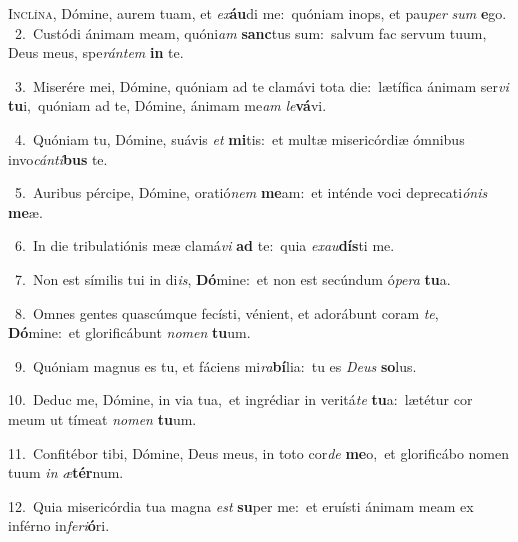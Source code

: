 \lettrine{\initial\textcolor{\initialcolor}{I}}{nclína,} Dómine, aurem tuam, et \textit{ex}\-\textbf{áu}di me:~\star quóniam inops, et pau\textit{per} \textit{sum} \textbf{e}\-go.\\
{\numbfont\textcolor{\numbcolor}{~2.}}~Custódi ánimam meam, quóni\textit{am} \textbf{sanc}\-tus sum:~\star salvum fac servum tuum, Deus meus, spe\-\textit{rán}\-\textit{tem} \textbf{in} te.\par
{\numbfont\textcolor{\numbcolor}{~3.}}~Miserére mei, Dómine, quóniam ad te clamávi tota die:~\dagger lætífica ánimam ser\textit{vi} \textbf{tu}\-i,~\star quóniam ad te, Dómine, ánimam me\textit{am} \textit{le}\-\textbf{vá}vi.\par
{\numbfont\textcolor{\numbcolor}{~4.}}~Quóniam tu, Dómine, suávis \textit{et} \textbf{mi}\-tis:~\star et multæ misericórdiæ ómnibus invo\-\textit{cán}\-\textit{ti}\textbf{bus} te.\par
{\numbfont\textcolor{\numbcolor}{~5.}}~Auribus pércipe, Dómine, oratió\textit{nem} \textbf{me}\-am:~\star et inténde voci deprecati\-\textit{ó}\-\textit{nis} \textbf{me}\-æ.\par
{\numbfont\textcolor{\numbcolor}{~6.}}~In die tribulatiónis meæ clamá\textit{vi} \textbf{ad} te:~\star quia \textit{ex}\-\textit{au}\textbf{dís}ti me.\par
{\numbfont\textcolor{\numbcolor}{~7.}}~Non est símilis tui in di\-\textit{is}\-, \textbf{Dó}\-mine:~\star et non est secúndum ó\-\textit{pe}\-\textit{ra} \textbf{tu}\-a.\par
{\numbfont\textcolor{\numbcolor}{~8.}}~Omnes gentes quascúmque fecísti, vénient, et adorábunt coram \textit{te}\-, \textbf{Dó}\-mine:~\star et glorificábunt \textit{no}\-\textit{men} \textbf{tu}\-um.\par
{\numbfont\textcolor{\numbcolor}{~9.}}~Quóniam magnus es tu, et fáciens mi\-\textit{ra}\-\textbf{bí}lia:~\star tu es \textit{De}\-\textit{us} \textbf{so}\-lus.\par
{\numbfont\textcolor{\numbcolor}{10.}}~Deduc me, Dómine, in via tua,~\dagger et ingrédiar in veritá\textit{te} \textbf{tu}\-a:~\star lætétur cor meum ut tímeat \textit{no}\-\textit{men} \textbf{tu}\-um.\par
{\numbfont\textcolor{\numbcolor}{11.}}~Confitébor tibi, Dómine, Deus meus, in toto cor\textit{de} \textbf{me}\-o,~\star et glorificábo nomen tuum \textit{in} \textit{æ}\-\textbf{tér}num.\par
{\numbfont\textcolor{\numbcolor}{12.}}~Quia misericórdia tua magna \textit{est} \textbf{su}\-per me:~\star et eruísti ánimam meam ex inférno in\-\textit{fe}\-\textit{ri}\textbf{ó}ri.\par

